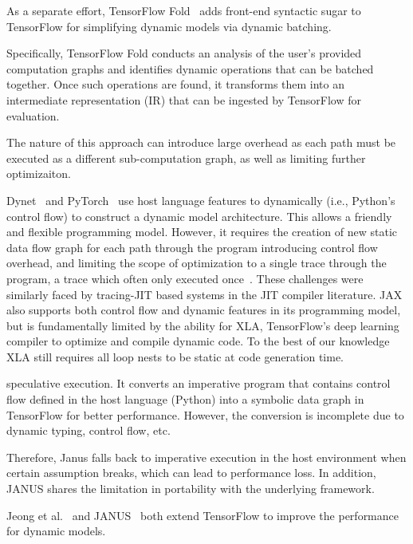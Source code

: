      As a separate effort, TensorFlow Fold~\citep{tensorflowfold} adds front-end
     syntactic sugar to TensorFlow for simplifying dynamic models via dynamic batching.

     Specifically, TensorFlow Fold conducts an analysis of the user's provided computation
     graphs and identifies dynamic operations that can be batched together. Once such operations
     are found, it transforms them into an intermediate representation (IR) that can be
     ingested by TensorFlow for evaluation.

     The nature of this approach can introduce large overhead as each path must
     be executed as a different sub-computation graph, as well as limiting further optimizaiton.

    Dynet~\citep{neubig2017dynet} and PyTorch~\citep{pytorch} use host language features
    to dynamically (i.e., Python's control flow) to construct a dynamic model architecture.
    This allows a friendly and flexible programming model.
    However, it requires the creation of new static data flow graph for each path through
    the program introducing control flow overhead, and limiting the scope of optimization
    to a single trace through the program, a trace which often only executed once~\citep{xu2018cavs}. These challenges were similarly faced by tracing-JIT based systems in the JIT compiler literature. JAX~\citep{jax2018github} also supports both control flow and dynamic features in its programming model, but is fundamentally limited by the ability for XLA, TensorFlow's deep learning compiler to optimize and compile dynamic code. To the best of our knowledge XLA still requires all loop nests to be static at code generation time.

    speculative execution. It converts an imperative program that contains control
    flow defined in the host language (Python) into a symbolic data graph in
     TensorFlow for better performance. However, the conversion is incomplete
     due to dynamic typing, control flow, etc.

    Therefore, Janus falls back to imperative execution in
    the host environment when certain assumption breaks, which can
    lead to performance loss. In addition, JANUS shares the limitation in
    portability with the underlying framework.

    Jeong et al.~\citep{jeong2018improving} and JANUS~\citep{jeong2019janus}
     both extend TensorFlow to improve the performance for dynamic models.

